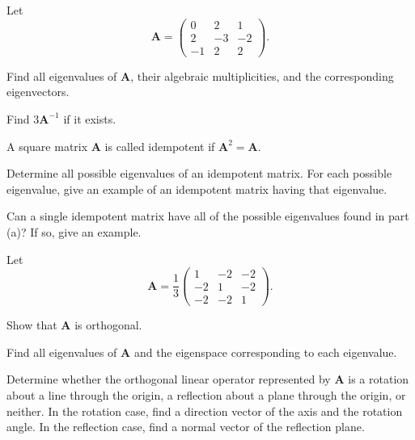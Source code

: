 \documentclass[11pt,oneside]{article}
\begin{document}
\begin{problem}
Let
\[
\mathbf A=
\begin{pmatrix}
0&2&1\\
2&-3&-2\\
-1&2&2
\end{pmatrix}.
\]
\begin{problemsubparts}
\item Find all eigenvalues of $\mathbf A$, their algebraic multiplicities, and the corresponding eigenvectors.
\item Find $3\mathbf A^{-1}$ if it exists.
\end{problemsubparts}
\end{problem}

\begin{problem}
A square matrix $\mathbf A$ is called idempotent if $\mathbf A^2=\mathbf A$.
\begin{problemsubparts}
\item Determine all possible eigenvalues of an idempotent matrix. For each possible eigenvalue, give an example of an idempotent matrix having that eigenvalue.
\item Can a single idempotent matrix have all of the possible eigenvalues found in part \textup{(a)}? If so, give an example.
\end{problemsubparts}
\end{problem}

\begin{problem}
Let
\[
\mathbf A=
\frac13
\begin{pmatrix}
1&-2&-2\\
-2&1&-2\\
-2&-2&1
\end{pmatrix}.
\]
\begin{problemsubparts}
\item Show that $\mathbf A$ is orthogonal.
\item Find all eigenvalues of $\mathbf A$ and the eigenspace corresponding to each eigenvalue.
\item Determine whether the orthogonal linear operator represented by $\mathbf A$ is a rotation about a line through the origin, a reflection about a plane through the origin, or neither. In the rotation case, find a direction vector of the axis and the rotation angle. In the reflection case, find a normal vector of the reflection plane.
\end{problemsubparts}
\end{problem}
\end{document}
